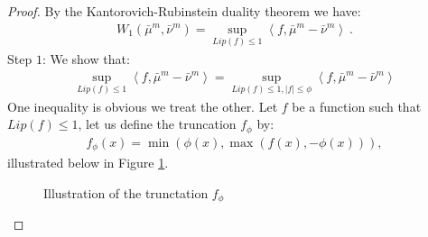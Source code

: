 \documentclass[11pt,a4paper]{article}
\newcommand{\brac}[1]{\left\langle#1\right\rangle}
\begin{document}
\begin{proof}
    By the Kantorovich-Rubinstein duality theorem we have:
    \begin{align*}
        W_1(\bar{\mu}^m,\bar{\nu}^m) = \sup\limits_{Lip(f) \leq 1} \brac{f,\bar{\mu}^m - \bar{\nu}^m} \ .
    \end{align*}
    Step $1$: We show that:
    \begin{align*}
        \sup\limits_{Lip(f) \leq 1} \brac{f,\bar{\mu}^m - \bar{\nu}^m} = \sup\limits_{Lip(f) \leq 1,|f| \leq \phi} \brac{f,\bar{\mu}^m - \bar{\nu}^m}
    \end{align*}
    One inequality is obvious we treat the other. Let $f$ be a function such that $Lip(f) \leq 1$, let us define the truncation $f_\phi$ by:
    \begin{align*}
        f_\phi(x) = \min(\phi(x),\max(f(x),-\phi(x))),
    \end{align*}
    illustrated below in Figure \ref{fig:illustration-of-truncation}.
    \begin{center}
  \begin{figure}[h]
    \centering
    \pgfplotsset{compat=1.18}
    \caption{Illustration of the trunctation $f_\phi$}
    \label{fig:illustration-of-truncation}
  \end{figure}
  \begin{figure}[ht]
\centering


\end{figure}
\end{center}
\end{proof}
\end{document}
